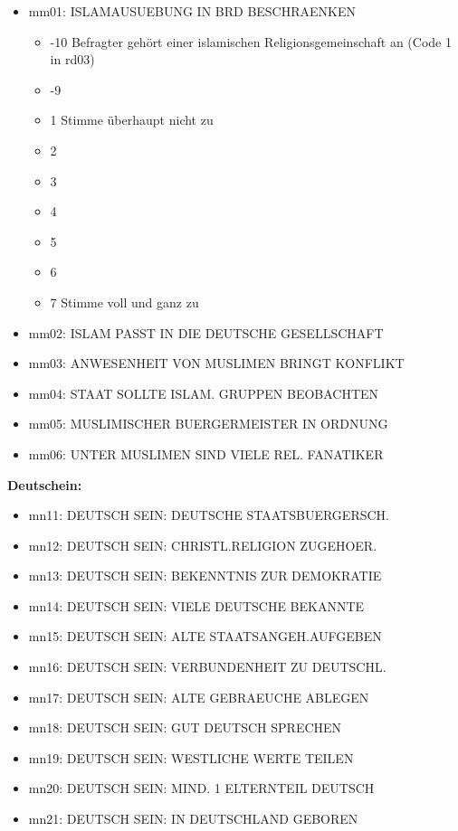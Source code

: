 \documentclass[]{article}
\providecommand{\tightlist}{%
  \setlength{\itemsep}{0pt}\setlength{\parskip}{0pt}}
\begin{document}
\begin{itemize}
\tightlist
\item
  mm01: ISLAMAUSUEBUNG IN BRD BESCHRAENKEN

  \begin{itemize}
  \tightlist
  \item
    -10 Befragter gehört einer islamischen Religionsgemeinschaft an
    (Code 1 in rd03)
  \item
    -9
  \item
    1 Stimme überhaupt nicht zu
  \item
    2
  \item
    3
  \item
    4
  \item
    5
  \item
    6
  \item
    7 Stimme voll und ganz zu
  \end{itemize}
\item
  mm02: ISLAM PASST IN DIE DEUTSCHE GESELLSCHAFT
\item
  mm03: ANWESENHEIT VON MUSLIMEN BRINGT KONFLIKT
\item
  mm04: STAAT SOLLTE ISLAM. GRUPPEN BEOBACHTEN
\item
  mm05: MUSLIMISCHER BUERGERMEISTER IN ORDNUNG
\item
  mm06: UNTER MUSLIMEN SIND VIELE REL. FANATIKER
\end{itemize}

\textbf{Deutschein:}

\begin{itemize}
\tightlist
\item
  mn11: DEUTSCH SEIN: DEUTSCHE STAATSBUERGERSCH.
\item
  mn12: DEUTSCH SEIN: CHRISTL.RELIGION ZUGEHOER.
\item
  mn13: DEUTSCH SEIN: BEKENNTNIS ZUR DEMOKRATIE
\item
  mn14: DEUTSCH SEIN: VIELE DEUTSCHE BEKANNTE
\item
  mn15: DEUTSCH SEIN: ALTE STAATSANGEH.AUFGEBEN
\item
  mn16: DEUTSCH SEIN: VERBUNDENHEIT ZU DEUTSCHL.
\item
  mn17: DEUTSCH SEIN: ALTE GEBRAEUCHE ABLEGEN
\item
  mn18: DEUTSCH SEIN: GUT DEUTSCH SPRECHEN
\item
  mn19: DEUTSCH SEIN: WESTLICHE WERTE TEILEN
\item
  mn20: DEUTSCH SEIN: MIND. 1 ELTERNTEIL DEUTSCH
\item
  mn21: DEUTSCH SEIN: IN DEUTSCHLAND GEBOREN
\end{itemize}
\end{document}
